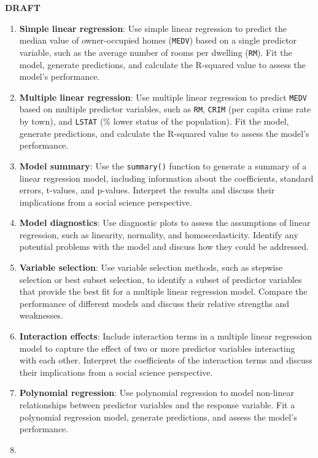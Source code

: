 \documentclass[
]{book}
\providecommand{\tightlist}{%
  \setlength{\itemsep}{0pt}\setlength{\parskip}{0pt}}
\begin{document}
\textbf{DRAFT}

\begin{enumerate}
\def\labelenumi{\arabic{enumi}.}
\tightlist
\item
  \textbf{Simple linear regression}: Use simple linear regression to predict the median value of owner-occupied homes (\texttt{MEDV}) based on a single predictor variable, such as the average number of rooms per dwelling (\texttt{RM}). Fit the model, generate predictions, and calculate the R-squared value to assess the model's performance.
\item
  \textbf{Multiple linear regression}: Use multiple linear regression to predict \texttt{MEDV} based on multiple predictor variables, such as \texttt{RM}, \texttt{CRIM} (per capita crime rate by town), and \texttt{LSTAT} (\% lower status of the population). Fit the model, generate predictions, and calculate the R-squared value to assess the model's performance.
\item
  \textbf{Model summary}: Use the \texttt{summary()} function to generate a summary of a linear regression model, including information about the coefficients, standard errors, t-values, and p-values. Interpret the results and discuss their implications from a social science perspective.
\item
  \textbf{Model diagnostics}: Use diagnostic plots to assess the assumptions of linear regression, such as linearity, normality, and homoscedasticity. Identify any potential problems with the model and discuss how they could be addressed.
\item
  \textbf{Variable selection}: Use variable selection methods, such as stepwise selection or best subset selection, to identify a subset of predictor variables that provide the best fit for a multiple linear regression model. Compare the performance of different models and discuss their relative strengths and weaknesses.
\item
  \textbf{Interaction effects}: Include interaction terms in a multiple linear regression model to capture the effect of two or more predictor variables interacting with each other. Interpret the coefficients of the interaction terms and discuss their implications from a social science perspective.
\item
  \textbf{Polynomial regression}: Use polynomial regression to model non-linear relationships between predictor variables and the response variable. Fit a polynomial regression model, generate predictions, and assess the model's performance.
\item

\end{enumerate}
\end{document}
